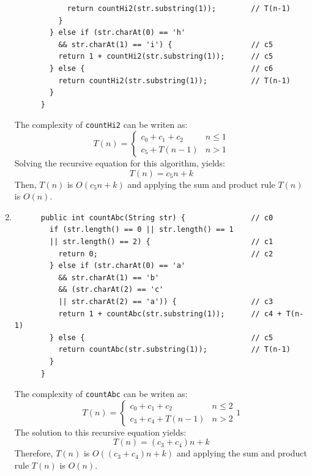 \documentclass[a4paper,12pt]{article}
\begin{document}
\begin{enumerate}
\begin{Verbatim}
            return countHi2(str.substring(1));        // T(n-1)
          }
        } else if (str.charAt(0) == 'h'
          && str.charAt(1) == 'i') {                  // c5
          return 1 + countHi2(str.substring(1));      // c5
        } else {                                      // c6
          return countHi2(str.substring(1));          // T(n-1)
        }
      }
      \end{Verbatim}
      The complexity of \texttt{countHi2} can be writen as:
      \begin{equation*}
        T\left( n \right)=\left\{\begin{array}{cc} c_{0}+c_{1}+c_{2} & n\leq 1 \\ c_5+T\left( n-1 \right) & n>1\end{array}\right.
      \end{equation*}
      Solving the recursive equation for this algorithm, yields:
      \begin{equation*}
        T\left( n \right)=c_5n+k
      \end{equation*}
      Then, $T(n)$ is $O(c_5n+k)$ and applying the sum and product rule $T(n)$ is $O(n)$.
      \item \begin{Verbatim}
      public int countAbc(String str) {               // c0
        if (str.length() == 0 || str.length() == 1
        || str.length() == 2) {                       // c1
          return 0;                                   // c2
        } else if (str.charAt(0) == 'a'
          && str.charAt(1) == 'b'
          && (str.charAt(2) == 'c'
          || str.charAt(2) == 'a')) {                 // c3
          return 1 + countAbc(str.substring(1));      // c4 + T(n-1)
        } else {                                      // c5
          return countAbc(str.substring(1));          // T(n-1)
        }
      }
      \end{Verbatim}
      The complexity of \texttt{countAbc} can be writen as:
      \begin{equation*}
        T\left( n \right)=\left\{\begin{array}{cc} c_{0}+c_{1}+c_{2} & n\leq 2 \\ c_3 + c_ 4 + T\left( n-1 \right) & n>2\end{array}1\right.
      \end{equation*}
      The solution to this recursive equation yields:
      \begin{equation*}
        T(n)=(c_3+c_4)n+k
      \end{equation*}
      Therefore, $T(n)$ is $O((c_3+c_4)n+k)$ and applying the sum and product rule $T(n)$ is $O(n)$.


\end{enumerate}
\end{document}
